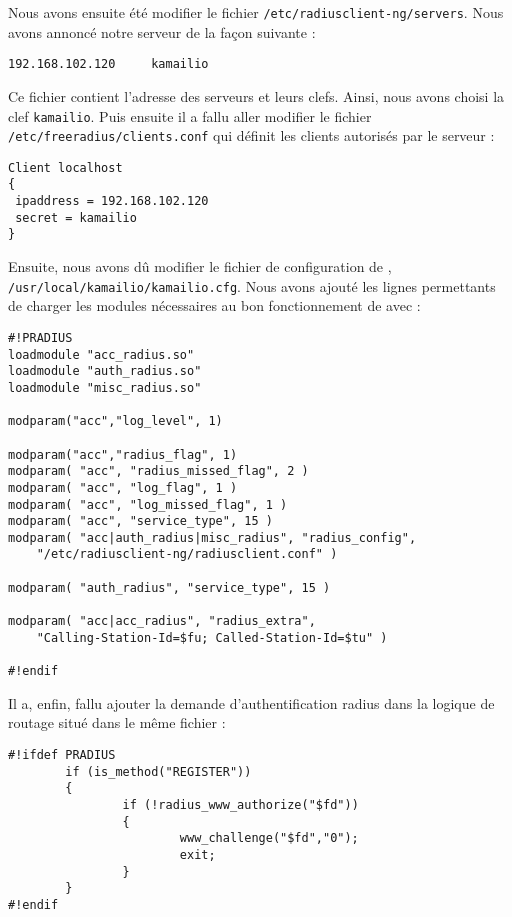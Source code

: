 Nous avons ensuite été modifier le fichier \texttt{/etc/radiusclient-ng/servers}. Nous avons annoncé notre serveur de la façon suivante :

\begin{verbatim}
192.168.102.120		kamailio
\end{verbatim}

Ce fichier contient l'adresse des serveurs {\rad} et leurs clefs. Ainsi, nous avons choisi la clef \texttt{kamailio}.
Puis ensuite il a fallu aller modifier le fichier \texttt{/etc/freeradius/clients.conf} qui définit les clients autorisés par le serveur {\frad} :

\begin{verbatim}
Client localhost
{
 ipaddress = 192.168.102.120
 secret = kamailio
}
\end{verbatim}

Ensuite, nous avons dû modifier le fichier de configuration de {\kam}, \texttt{/usr/local/kamailio/kamailio.cfg}. Nous avons ajouté les lignes permettants de charger les modules nécessaires au bon fonctionnement de {\kam} avec {\frad} :

\begin{verbatim}
#!PRADIUS
loadmodule "acc_radius.so"
loadmodule "auth_radius.so"
loadmodule "misc_radius.so"

modparam("acc","log_level", 1)

modparam("acc","radius_flag", 1)
modparam( "acc", "radius_missed_flag", 2 )
modparam( "acc", "log_flag", 1 )
modparam( "acc", "log_missed_flag", 1 )
modparam( "acc", "service_type", 15 )
modparam( "acc|auth_radius|misc_radius", "radius_config",
	"/etc/radiusclient-ng/radiusclient.conf" )

modparam( "auth_radius", "service_type", 15 )

modparam( "acc|acc_radius", "radius_extra",
	"Calling-Station-Id=$fu; Called-Station-Id=$tu" )

#!endif
\end{verbatim}


Il a, enfin, fallu ajouter la demande d'authentification radius dans la logique de routage situé dans le même fichier :

\begin{verbatim}
#!ifdef PRADIUS
        if (is_method("REGISTER"))
        {
                if (!radius_www_authorize("$fd"))
                {
                        www_challenge("$fd","0");
                        exit;
                }
        }
#!endif
\end{verbatim}



